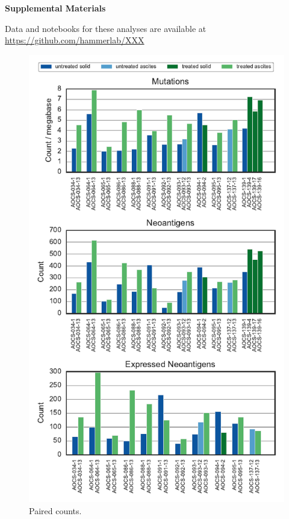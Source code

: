 
\pagebreak
\begin{center}
\textbf{\large Supplemental Materials}
\end{center}

\setcounter{equation}{0}
\setcounter{figure}{0}
\setcounter{table}{0}
\makeatletter
\renewcommand{\theequation}{S\arabic{equation}}
\renewcommand{\thefigure}{S\arabic{figure}}

Data and notebooks for these analyses are available at \url{https://github.com/hammerlab/XXX}

\begin{figure}
\centering
\includegraphics[scale=1.0]{figures/paired_counts.pdf}
\caption{Paired counts. }
\label{sfig:supp_paired}
\end{figure}

